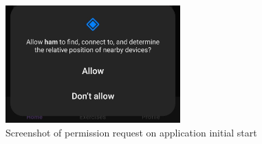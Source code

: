 \begin{figure}[H]
    \centering
    \includegraphics[width=0.6\textwidth]{images/permission-request.jpeg}
    \caption{Screenshot of permission request on application initial start}
    \label{fig:req_permission}
\end{figure}